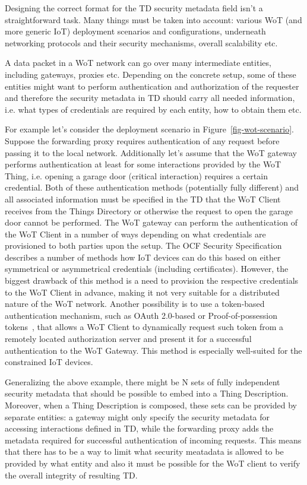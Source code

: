 
Designing the correct format for the TD security metadata field isn't a straightforward task.
Many things must be taken into account: various WoT (and more generic IoT) deployment scenarios and configurations, underneath networking protocols and their security mechanisms, overall scalability etc.

A data packet in a WoT network can go over many intermediate entities, including gateways, proxies etc.
Depending on the concrete setup, some of these entities might want to perform authentication and authorization of the requester and therefore the security metadata in TD should carry all needed information, i.e. what types of credentials are required by each entity, how to obtain them etc.

For example let's consider the deployment scenario in Figure~\ref{fig-wot-scenario}.
Suppose the forwarding proxy requires authentication of any request before passing it to the local network.
Additionally let's assume that the WoT gateway performs authentication at least for some interactions provided by the WoT Thing, i.e. opening a garage door (critical interaction) requires a certain credential.
Both of these authentication methods (potentially fully different) and all associated information must be specified in the TD that the WoT Client receives from the Things Directory or otherwise the request to open the garage door cannot be performed.
The WoT gateway can perform the authentication of the WoT Client in a number of ways depending on what credentials are provisioned to both parties upon the setup.
The OCF Security Specification~\cite{ocf2017} describes a number of methods how IoT devices can do this based on either symmetrical or asymmetrical credentials (including certificates). 
However, the biggest drawback of this method is a need to provision the respective credentials to the WoT Client in advance, making it not very suitable for a distributed nature of the WoT network.
Another possibility is to use a token-based authentication mechanism, such as OAuth 2.0-based or Proof-of-possession tokens~\cite{ace2017}, that allows  
a WoT Client to dynamically request such token from a remotely located authorization server and present it for a successful authentication to the WoT Gateway.
This method is especially well-suited for the constrained IoT devices. 

Generalizing the above example, there might be N sets of fully independent security metadata that should be possible to embed into a Thing Description.
Moreover, when a Thing Description is composed, these sets can be provided by separate entities: a gateway might only specify the security metadata for accessing interactions defined in TD, while the forwarding proxy adds the metadata required for successful authentication of incoming requests.
This means that there has to be a way to limit what security meatadata is allowed to be provided by what entity and also it must be possible for the WoT client to verify the overall integrity of resulting TD. 
 

